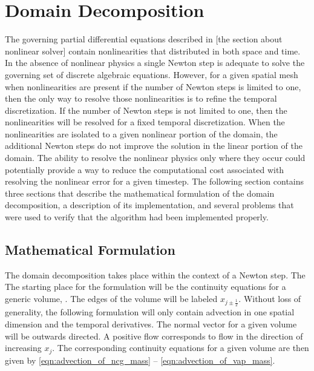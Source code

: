 \chapter{Domain Decomposition}
\label{chap:domain_decomposition}
The governing partial differential equations described in [the section about nonlinear solver] contain nonlinearities that distributed in both space and time.
In the absence of nonlinear physics a single Newton step is adequate to solve the governing set of discrete algebraic equations.
However, for a given spatial mesh when nonlinearities are present if the number of Newton steps is limited to one, then the only way to resolve those nonlinearities is to refine the temporal discretization.
If the number of Newton steps is not limited to one, then the nonlinearities will be resolved for a fixed temporal discretization.
When the nonlinearities are isolated to a given nonlinear portion of the domain, the additional Newton steps do not improve the solution in the linear portion of the domain.
The ability to resolve the nonlinear physics only where they occur could potentially provide a way to reduce the computational cost associated with resolving the nonlinear error for a given timestep.
The following section contains three sections that describe the mathematical formulation of the domain decomposition, a description of its implementation, and several problems that were used to verify that the algorithm had been implemented properly.

\section{Mathematical Formulation}
\label{sec:dd:math}

The domain decomposition takes place within the context of a Newton step.
The 
The starting place for the formulation will be the continuity equations for a generic volume,  .
The edges of the volume will be labeled $x_{j \pm \frac{1}{2}}$.
Without loss of generality, the following formulation will only contain advection in one spatial dimension and the temporal derivatives.
The normal vector for a given volume will be outwards directed.
A positive flow corresponds to flow in the direction of increasing $x_{j}$.  
The corresponding continuity equations for a given volume are then given by \eqref{eqn:advection_of_ncg_mass} -- \eqref{eqn:advection_of_vap_mass}.

